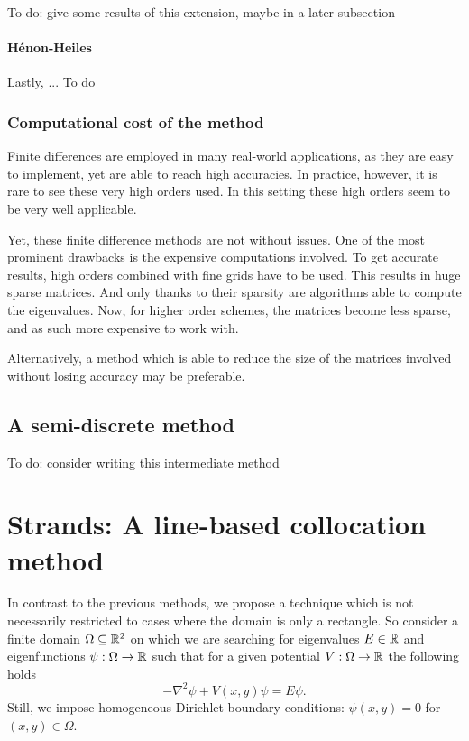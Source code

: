    {\color{red}To do: give some results of this extension, maybe in a later subsection}

\paragraph{Hénon-Heiles} Lastly, ... {\color{red}To do}


\subsubsection{Computational cost of the method}

Finite differences are employed in many real-world applications, as they are easy to implement, yet are able to reach high accuracies. In practice, however, it is rare to see these very high orders used. In this setting these high orders seem to be very well applicable.

Yet, these finite difference methods are not without issues. One of the most prominent drawbacks is the expensive computations involved. To get accurate results, high orders combined with fine grids have to be used. This results in huge sparse matrices. And only thanks to their sparsity are algorithms able to compute the eigenvalues. Now, for higher order schemes, the matrices become less sparse, and as such more expensive to work with.

Alternatively, a method which is able to reduce the size of the matrices involved without losing accuracy may be preferable.

\subsection{A semi-discrete method}\label{sec:c4_semi_discrete}

{\color{red} To do: consider writing this intermediate method}

\section{Strands: A line-based collocation method}

In contrast to the previous methods, we propose a technique which is not necessarily restricted to cases where the domain is only a rectangle. So consider a finite domain $\Omega \subseteq \mathbb{R}^2$ on which we are searching for eigenvalues $E \in \mathbb{R}$ and eigenfunctions $\psi: \Omega \to \mathbb{R}$ such that for a given potential $V : \Omega \to \mathbb{R}$ the following holds
\begin{equation}\label{equ:c4_schrodinger_equation_new_method}
    -\nabla^2 \psi + V(x, y) \psi = E \psi\text{.}
\end{equation}
Still, we impose homogeneous Dirichlet boundary conditions: $\psi(x, y) = 0$ for $(x, y) \in \Omega$.

